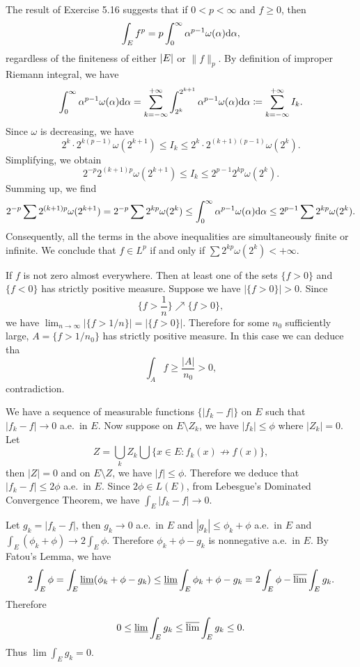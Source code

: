 \begin{exercise}{5.18}
  The result of Exercise 5.16 suggests that if $0 < p < \infty$ and $f \ge 0$, then
  \[
    \int_E f^p = p \int_0^{\infty} \alpha^{p-1} \omega(\alpha) \mathrm{d} \alpha,
  \]
  regardless of the finiteness of either $\left\vert E\right\vert$ or $\lVert f \rVert_p$.
  By definition of improper Riemann integral, we have
  \[
    \int_0^\infty \alpha^{p-1} \omega(\alpha) \mathrm{d} \alpha =
    \sum_{k = -\infty}^{+\infty}
    \int_{2^k}^{2^{k+1}} \alpha^{p-1} \omega(\alpha) \mathrm{d} \alpha
    \coloneqq \sum_{k = -\infty}^{+\infty} I_k.
  \]
  Since $\omega$ is decreasing, we have
  \[
    2^k \cdot 2^{k(p-1)} \omega(2^{k+1}) \le I_k \le 2^k \cdot 2^{(k+1)(p-1)} \omega(2^k).
  \]
  Simplifying, we obtain
  \[
    2^{-p} 2^{(k+1)p} \omega(2^{k+1}) \le I_k \le 2^{p-1} 2^{kp} \omega(2^k).
  \]
  Summing up, we find
  \[
    2^{-p} \sum 2^{(k+1)p} \omega(2^{k+1})
    = 2^{-p} \sum 2^{kp} \omega(2^k)
    \le \int_0^\infty \alpha^{p-1} \omega(\alpha) \mathrm{d} \alpha
    \le 2^{p-1} \sum 2^{kp} \omega(2^k).
  \]
  Consequently, all the terms in the above inequalities
  are simultaneously finite or infinite.
  We conclude that $f \in L^p$ if and only if $\sum 2^{kp} \omega(2^k) < + \infty$.
\end{exercise}


\begin{exercise}{5.21}
  If $f$ is not zero almost everywhere.
  Then at least one of the sets $\{f>0\}$ and $\{f<0\}$ has strictly positive measure.
  Suppose we have $|\{f>0\}|>0$.
  Since \[\{f>\frac{1}{n}\}\nearrow\{f>0\},\]
  we have $\lim_{n\rightarrow\infty}|\{f>1/n\}|=|\{f>0\}|$.
  Therefore for some $n_0$ sufficiently large,
  $A=\{f>1/n_0\}$ has strictly positive measure.
  In this case we can deduce tha\[\int_A f\geq\frac{|A|}{n_0}>0, \] contradiction.
\end{exercise}

\begin{exercise}{5.22}
  We have a sequence of measurable functions $\{|f_k-f|\}$ on $E$
  such that $|f_k-f|\rightarrow 0$ a.e.\ in $E$.
  Now suppose on $E\setminus Z_k$, we have $|f_k|\leq \phi$ where $|Z_k|=0$.
  Let \[Z=\bigcup_k Z_k\bigcup\{x\in E:f_k(x)\not\rightarrow f(x)\},\]
  then $|Z|=0$ and on $E\setminus Z$,
  we have $|f|\leq \phi$.
  Therefore we deduce that $|f_k-f|\leq 2\phi$ a.e.\ in $E$.
  Since $2\phi\in L(E)$, from Lebesgue's Dominated Convergence Theorem,
  we have $\int_E|f_k-f|\rightarrow 0.$
\end{exercise}

\begin{exercise}{5.23}
  Let $g_k=|f_k-f|$, then $g_k\rightarrow 0$ a.e.\ in $E$
  and $|g_k|\leq \phi_k+\phi$ a.e.\ in $E$
  and $\int_E(\phi_k+\phi)\rightarrow 2\int_E\phi.$
  Therefore $\phi_k+\phi-g_k$ is nonnegative a.e.\ in $E$.
  By Fatou's Lemma, we have
  \[2\int_E\phi=\int_E\varliminf(\phi_k+\phi-g_k)\leq\varliminf\int_E\phi_k+\phi-g_k=2\int_E\phi-\varlimsup\int_Eg_k.\]
  Therefore \[0\leq\varliminf\int_E g_k\leq\varlimsup\int_Eg_k\leq 0.\]
  Thus $\lim\int_Eg_k=0.$
\end{exercise}

